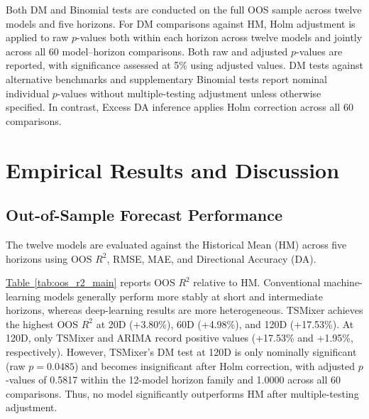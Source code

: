\documentclass[runningheads,orivec]{llncs}
\begin{document}
Both DM and Binomial tests are conducted on the full OOS sample across twelve models and five horizons. For DM comparisons against HM, Holm adjustment is applied to raw $p$-values both within each horizon across twelve models and jointly across all 60 model--horizon comparisons. Both raw and adjusted $p$-values are reported, with significance assessed at 5\% using adjusted values. DM tests against alternative benchmarks and supplementary Binomial tests report nominal individual $p$-values without multiple-testing adjustment unless otherwise specified. In contrast, Excess DA inference applies Holm correction across all 60 comparisons.

\section{Empirical Results and Discussion}\label{sec:results}

\subsection{Out-of-Sample Forecast Performance}\label{subsec:oos_performance}

The twelve models are evaluated against the Historical Mean (HM) across five horizons using OOS $R^2$, RMSE, MAE, and Directional Accuracy (DA).

\hyperref[tab:oos_r2_main]{Table~\ref*{tab:oos_r2_main}} reports OOS $R^2$ relative to HM. Conventional machine-learning models generally perform more stably at short and intermediate horizons, whereas deep-learning results are more heterogeneous. TSMixer achieves the highest OOS $R^2$ at 20D (+3.80\%), 60D (+4.98\%), and 120D (+17.53\%). At 120D, only TSMixer and ARIMA record positive values (+17.53\% and +1.95\%, respectively). However, TSMixer's DM test at 120D is only nominally significant (raw $p = 0.0485$) and becomes insignificant after Holm correction, with adjusted $p$-values of 0.5817 within the 12-model horizon family and 1.0000 across all 60 comparisons. Thus, no model significantly outperforms HM after multiple-testing adjustment.
\end{document}
